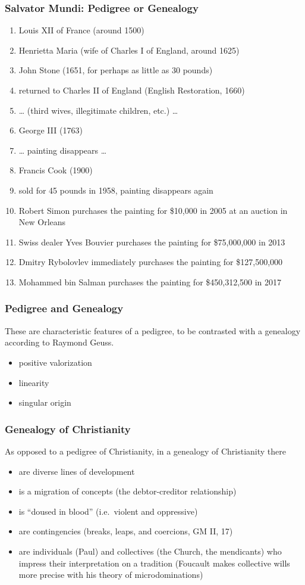 \documentclass[xcolor=dvipsnames]{beamer}
\begin{document}
\begin{frame}
  \frametitle{Salvator Mundi: Pedigree or Genealogy}
  \begin{enumerate}
  \item Louis XII of France (around 1500)
  \item Henrietta Maria (wife of Charles I of England, around 1625)
  \item John Stone (1651, for perhaps as little as 30 pounds)
  \item returned to Charles II of England (English Restoration, 1660)
  \item {\ldots} (third wives, illegitimate children, etc.) {\ldots}
  \item George III (1763)
  \item {\ldots} painting disappears {\ldots}
  \item Francis Cook (1900)
  \item sold for 45 pounds in 1958, painting disappears again
  \item Robert Simon purchases the painting for \$10,000 in 2005 at an
    auction in New Orleans
  \item Swiss dealer Yves Bouvier purchases the painting for
    \$75,000,000 in 2013
  \item Dmitry Rybolovlev immediately purchases the painting for
    \$127,500,000
  \item Mohammed bin Salman purchases the painting for \$450,312,500
    in 2017
  \end{enumerate}
\end{frame}

\begin{frame}
  \frametitle{Pedigree and Genealogy}
  These are characteristic features of a pedigree, to be contrasted
  with a genealogy according to Raymond Geuss.
  \begin{itemize}
  \item positive valorization
  \item linearity
  \item singular origin
  \end{itemize}
\end{frame}

\begin{frame}
  \frametitle{Genealogy of Christianity}
  As opposed to a pedigree of Christianity, in a genealogy of
  Christianity there 
  \begin{itemize}
  \item are diverse lines of development
  \item is a migration of concepts (the debtor-creditor relationship)
  \item is ``doused in blood'' (i.e.\ violent and oppressive)
  \item are contingencies (breaks, leaps, and coercions, GM II, 17)
  \item are individuals (Paul) and collectives (the Church, the
    mendicants) who impress their interpretation on a tradition
    (Foucault makes collective wills more precise with his theory of
    microdominations)
  \end{itemize}
\end{frame}
\end{document}
